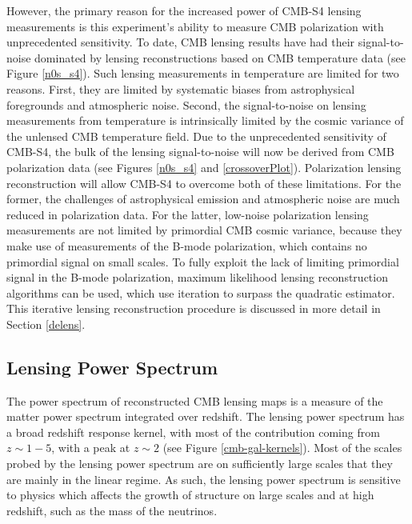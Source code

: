\documentclass{tcibook}
\begin{document}
However, the primary reason for the increased power of CMB-S4 lensing measurements is this experiment's ability to measure CMB polarization with unprecedented sensitivity. To date, CMB lensing results have had their signal-to-noise dominated by lensing reconstructions based on CMB temperature data (see Figure \ref{n0s_s4}). Such lensing measurements in temperature are limited for two reasons. First, they are limited by systematic biases from astrophysical foregrounds and atmospheric noise. Second, the signal-to-noise on lensing measurements from temperature is intrinsically limited by the cosmic variance of the unlensed CMB temperature field. Due to the unprecedented sensitivity of CMB-S4, the bulk of the lensing signal-to-noise will now be derived from CMB polarization data (see Figures \ref{n0s_s4} and \ref{crossoverPlot}).  Polarization lensing reconstruction will allow CMB-S4 to overcome both of these limitations. For the former, the challenges of astrophysical emission and atmospheric noise are much reduced in polarization data. For the latter, low-noise polarization lensing measurements are not limited by primordial CMB cosmic variance, because they make use of measurements of the B-mode polarization, which contains no primordial signal on small scales. To fully exploit the lack of limiting primordial signal in the B-mode polarization, maximum likelihood lensing reconstruction algorithms can be used, which use iteration to surpass the quadratic estimator. This iterative lensing reconstruction procedure is discussed in more detail in Section \ref{delens}.   


\subsection{Lensing Power Spectrum}\label{kappaPower}

The power spectrum of reconstructed CMB lensing maps is a measure of the matter power spectrum integrated over redshift.  The lensing power spectrum has a broad redshift response kernel, with most of the contribution coming from $z\sim 1-5$, with a peak at $z\sim 2$ (see Figure \ref{cmb-gal-kernels}).  
Most of the scales probed by the lensing power spectrum are on sufficiently
large scales that they are mainly in the linear regime.  As such, the lensing power spectrum is sensitive to physics which affects the growth of structure on large scales and at high redshift, such as the mass of the neutrinos. 
\end{document}

